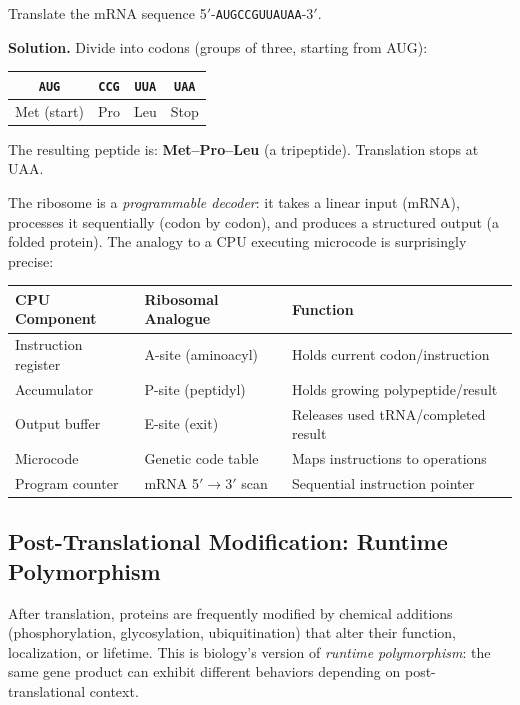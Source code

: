 \begin{example}
Translate the mRNA sequence 5$'$-\texttt{AUGCCGUUAUAA}-3$'$.

\textbf{Solution.} Divide into codons (groups of three, starting from AUG):
\begin{center}
\begin{tabular}{cccc}
\texttt{AUG} & \texttt{CCG} & \texttt{UUA} & \texttt{UAA} \\
\midrule
Met (start) & Pro & Leu & Stop \\
\end{tabular}
\end{center}
The resulting peptide is: \textbf{Met--Pro--Leu} (a tripeptide). Translation stops at UAA.
\end{example}

The ribosome is a \emph{programmable decoder}: it takes a linear input (mRNA), processes it sequentially (codon by codon), and produces a structured output (a folded protein). The analogy to a CPU executing microcode is surprisingly precise:

\begin{center}
\renewcommand{\arraystretch}{1.15}
\begin{tabularx}{0.9\textwidth}{L{3.2cm} L{3.5cm} Y}
\toprule
\textbf{CPU Component} & \textbf{Ribosomal Analogue} & \textbf{Function} \\
\midrule
Instruction register & A-site (aminoacyl) & Holds current codon/instruction \\
Accumulator & P-site (peptidyl) & Holds growing polypeptide/result \\
Output buffer & E-site (exit) & Releases used tRNA/completed result \\
Microcode & Genetic code table & Maps instructions to operations \\
Program counter & mRNA 5$'$$\to$3$'$ scan & Sequential instruction pointer \\
\bottomrule
\end{tabularx}
\end{center}

\subsection{Post-Translational Modification: Runtime Polymorphism}

After translation, proteins are frequently modified by chemical additions (phosphorylation, glycosylation, ubiquitination) that alter their function, localization, or lifetime. This is biology's version of \emph{runtime polymorphism}: the same gene product can exhibit different behaviors depending on post-translational context.

